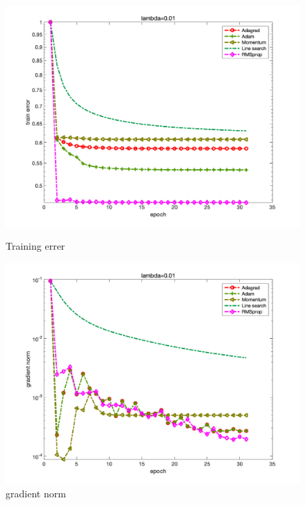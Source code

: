 \documentclass{article}
\begin{document}
\begin{figure}[H]
	\begin{minipage}{0.33\linewidth}
		\centering
		\includegraphics[width=1\linewidth]{./fig/fval_c4}
		\caption{Training errer}
	\end{minipage}
	\begin{minipage}{0.33\linewidth}
		\centering
		\includegraphics[width=1\linewidth]{./fig/gnorm_c4}
		\caption{gradient norm}
	\end{minipage}
	\begin{minipage}{0.33\linewidth}
		\centering

\end{minipage}
\end{figure}
\end{document}
